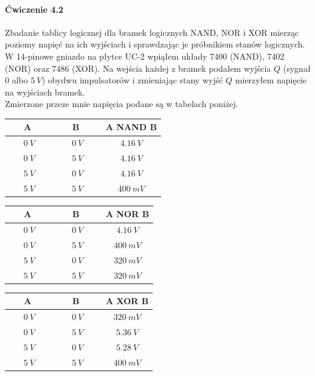 \documentclass[14pt, table]{extarticle}
\newcommand{\nl}{\vspace{0.5cm}}
\begin{document}
\newpage
\paragraph{Ćwiczenie 4.2 \\}
Zbadanie tablicy logicznej dla bramek logicznych NAND, NOR i XOR mierząc poziomy napięć na ich wyjściach i sprawdzając je próbnikiem stanów logicznych. \\

W 14-pinowe gniazdo na płytce UC-2 wpiąłem układy 7400 (NAND), 7402 (NOR) oraz 7486 (XOR). Na wejścia każdej z bramek podałem wyjścia $Q$ (sygnał $0$ albo $5\ V$) obydwu impulsatorów i zmieniając stany wyjść $Q$ mierzyłem napięcie na wyjściach bramek. \\

Zmierzone przeze mnie napięcia podane są w tabelach poniżej. \\

{
\centering
\begin{center}
\begin{tabular}{ | c | c | c | } 
  \hline
  \ \ \ \textbf{A} \ \ \ & \ \ \ \textbf{B} \ \ \ & \textbf{A NAND B} \\ 
  \hline
  $0 \ V$ & $0 \ V$ & $4.16 \ V$ \\
  \hline
  $0 \ V$ & $5 \ V$ & $4.16 \ V$ \\
  \hline
  $5 \ V$ & $0 \ V$ & $4.16 \ V$ \\
  \hline
  $5 \ V$ & $5 \ V$ & $400 \ mV$ \\
  \hline
\end{tabular}
\end{center}
}

\nl

{
\centering
\begin{center}
\begin{tabular}{ | c | c | c | } 
  \hline
  \ \ \ \textbf{A} \ \ \ & \ \ \ \textbf{B} \ \ \ & \textbf{A NOR B} \\ 
  \hline
  $0 \ V$ & $0 \ V$ & $4.16 \ V$ \\
  \hline
  $0 \ V$ & $5 \ V$ & $400 \ mV$ \\
  \hline
  $5 \ V$ & $0 \ V$ & $320 \ mV$ \\
  \hline
  $5 \ V$ & $5 \ V$ & $320 \ mV$ \\
  \hline
\end{tabular}
\end{center}
}

\nl

{
\centering
\begin{center}
\begin{tabular}{ | c | c | c | } 
  \hline
  \ \ \ \textbf{A} \ \ \ & \ \ \ \textbf{B} \ \ \ & \textbf{A XOR B}\\ 
  \hline
  $0 \ V$ & $0 \ V$ & $320 \ mV$ \\
  \hline
  $0 \ V$ & $5 \ V$ & $5.36 \ V$ \\
  \hline
  $5 \ V$ & $0 \ V$ & $5.28 \ V$ \\
  \hline
  $5 \ V$ & $5 \ V$ & $400 \ mV$ \\
  \hline
\end{tabular}
\end{center}
}
\end{document}

